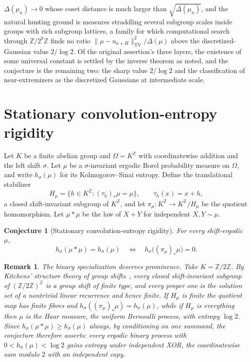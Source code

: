 \documentclass[11pt]{article}
\newtheorem{conjecture}{Conjecture}
\newtheorem{remark}{Remark}
\theoremstyle{definition}
\newcommand{\Z}{\mathbb Z}
\providecommand{\Z}{\mathbb Z}
\begin{document}
$\Delta(\mu_n)\to0$ whose coset distance is much larger than
$\sqrt{\Delta(\mu_n)}$, and the natural hunting ground is measures
straddling several subgroup scales inside groups with rich subgroup lattices, a family for which computational search through $\Z/2^{8}\Z$ finds no ratio $\|\mu-u_{a+H}\|_{\mathrm{TV}}^2/\Delta(\mu)$ above the discretized-Gaussian value $2/\log2$.  Of the original assertion's three layers, the existence of some universal constant is settled by the inverse theorem as noted, and the conjecture is the remaining two: the sharp value $2/\log2$ and the classification of near-extremizers as the discretized Gaussians at intermediate scale.

\section{Stationary convolution-entropy rigidity}

Let $K$ be a finite abelian group and $\Omega=K^{\Z}$ with coordinatewise addition and the left shift $\sigma$. Let $\mu$ be a $\sigma$-invariant ergodic Borel probability measure on $\Omega$, and write
$h_\sigma(\mu)$ for its Kolmogorov--Sinai entropy.  Define the
translational stabilizer
\[
H_\mu=\{h\in K^{\Z}:(\tau_h)_*\mu=\mu\},
\qquad\tau_h(x)=x+h,
\]
a closed shift-invariant subgroup of $K^{\Z}$, and let
$\pi_\mu:K^{\Z}\to K^{\Z}/H_\mu$ be the quotient homomorphism.  Let
$\mu*\mu$ be the law of $X+Y$ for independent $X,Y\sim\mu$.

\begin{conjecture}[Stationary convolution-entropy rigidity]\label{t6}
For every shift-ergodic $\mu$,
\[
h_\sigma(\mu*\mu)=h_\sigma(\mu)
\quad\Longleftrightarrow\quad
h_\sigma\bigl((\pi_\mu)_*\mu\bigr)=0 .
\]
\end{conjecture}

\begin{remark}\label{t6:binary}
The binary specialization deserves prominence.  Take $K=\Z/2\Z$.  By
Kitchens' structure theory of group shifts~\cite{Kit87}, every closed
shift-invariant subgroup of $(\Z/2\Z)^{\Z}$ is a group shift of finite
type, and every proper one is the solution set of a nontrivial linear
recurrence and hence finite.  If $H_\mu$ is finite the quotient map
has finite fibres and $h_\sigma((\pi_\mu)_*\mu)=h_\sigma(\mu)$, while
if $H_\mu$ is everything then $\mu$ is the Haar measure, the uniform
Bernoulli process, with entropy $\log2$.  Since
$h_\sigma(\mu*\mu)\ge h_\sigma(\mu)$ always, by conditioning on one
summand, the conjecture therefore asserts: every ergodic binary
process with $0<h_\sigma(\mu)<\log2$ gains entropy under independent
XOR, the coordinatewise sum modulo $2$ with an independent copy.
\end{remark}
\end{document}
